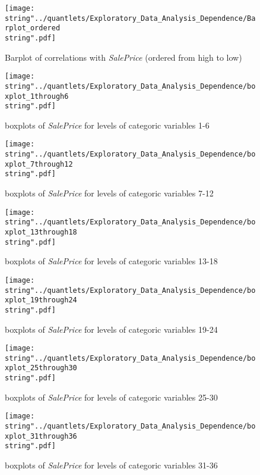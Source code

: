 \begin{figure}[H]
  \centering
\texttt{[image: \\string"../quantlets/Exploratory\_Data\_Analysis\_Dependence/Barplot\_ordered\\string".pdf]}
  \caption{Barplot of correlations with \textit{SalePrice} (ordered from high to low)}\label{fig:barplot_ordered}
\end{figure}

\begin{figure}[H]
\centering
\begin{minipage}{.5\textwidth}
	\centering
	\texttt{[image: \\string"../quantlets/Exploratory\_Data\_Analysis\_Dependence/boxplot\_1through6\\string".pdf]}
  	\caption{boxplots of \textit{SalePrice} for levels of categoric variables 1-6}
  	\label{fig:box1to6}
\end{minipage}%
\begin{minipage}{.5\textwidth}
\centering
	\texttt{[image: \\string"../quantlets/Exploratory\_Data\_Analysis\_Dependence/boxplot\_7through12\\string".pdf]}
  	\caption{boxplots of \textit{SalePrice} for levels of categoric variables 7-12}
  	\label{fig:box7to12}
\end{minipage}
\end{figure}

\begin{figure}[H]
\centering
\begin{minipage}{.5\textwidth}
	\centering
	\texttt{[image: \\string"../quantlets/Exploratory\_Data\_Analysis\_Dependence/boxplot\_13through18\\string".pdf]}
  	\caption{boxplots of \textit{SalePrice} for levels of categoric variables 13-18}
  	\label{fig:box13to18}
\end{minipage}%
\begin{minipage}{.5\textwidth}
\centering
	\texttt{[image: \\string"../quantlets/Exploratory\_Data\_Analysis\_Dependence/boxplot\_19through24\\string".pdf]}
  	\caption{boxplots of \textit{SalePrice} for levels of categoric variables 19-24}
  	\label{fig:box19to24}
\end{minipage}
\end{figure}

\begin{figure}[H]
\centering
\begin{minipage}{.5\textwidth}
	\centering
	\texttt{[image: \\string"../quantlets/Exploratory\_Data\_Analysis\_Dependence/boxplot\_25through30\\string".pdf]}
  	\caption{boxplots of \textit{SalePrice} for levels of categoric variables 25-30}
  	\label{fig:box25to30}
\end{minipage}%
\begin{minipage}{.5\textwidth}
\centering
	\texttt{[image: \\string"../quantlets/Exploratory\_Data\_Analysis\_Dependence/boxplot\_31through36\\string".pdf]}
  	\caption{boxplots of \textit{SalePrice} for levels of categoric variables 31-36}
  	\label{fig:box31to36}
\end{minipage}
\end{figure}

